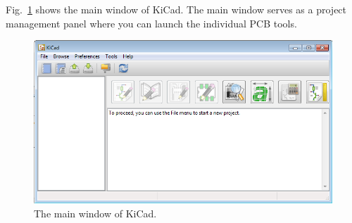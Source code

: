 \documentclass[12pt,letterpaper]{scrartcl}
\begin{document}
Fig.~\ref{fig:kicad-main} shows the main window of KiCad. The main window serves as a project management panel where you can launch the individual PCB tools. 

\begin{figure}[ht]
\centering
\includegraphics[width=5in]{kicad-main.png}
\caption{The main window of KiCad.}
\label{fig:kicad-main}
\end{figure}
\end{document}
